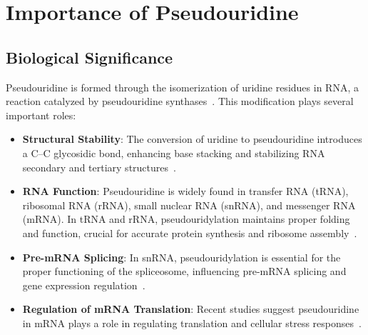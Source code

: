 \section{Importance of Pseudouridine}\label{sec:importance-of-pseudouridine}
  \subsection*{Biological Significance}
    Pseudouridine is formed through the isomerization of uridine residues in RNA, a reaction catalyzed by pseudouridine synthases~\cite{carlile_pseudouridine_2014}.
    This modification plays several important roles:

    \begin{itemize}
      \item \textbf{Structural Stability}: The conversion of uridine to pseudouridine introduces a C–C glycosidic bond, enhancing base stacking and stabilizing RNA secondary and tertiary structures~\cite{ge_rna_2013}.
      \item \textbf{RNA Function}: Pseudouridine is widely found in transfer RNA (tRNA), ribosomal RNA (rRNA), small nuclear RNA (snRNA), and messenger RNA (mRNA). In tRNA and rRNA, pseudouridylation maintains proper folding and function, crucial for accurate protein synthesis and ribosome assembly~\cite{schwartz_transcriptome-wide_2014}.
      \item \textbf{Pre-mRNA Splicing}: In snRNA, pseudouridylation is essential for the proper functioning of the spliceosome, influencing pre-mRNA splicing and gene expression regulation~\cite{karijolich_converting_2011}.
      \item \textbf{Regulation of mRNA Translation}: Recent studies suggest pseudouridine in mRNA plays a role in regulating translation and cellular stress responses~\cite{carlile_pseudouridine_2014}.
    \end{itemize}

